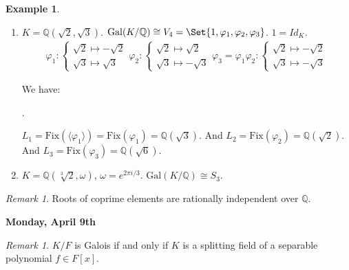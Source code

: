\documentclass[9pt,reqno,twoside]{amsbook}
\theoremstyle{plain}
\numberwithin{section}{chapter}
\numberwithin{equation}{chapter}
\theoremstyle{definition}
\newtheorem{Ex}[theorem]{Example}
\theoremstyle{remark}
\newtheorem{rem}[theorem]{Remark}
\theoremstyle{plain}
\newcommand{\Q}{\mathbb{Q}}
\newcommand{\bb}{\vspace{3mm}}
\newcommand{\bee}{\begin{equation}\begin{aligned}}
\newcommand{\eee}{\end{aligned}\end{equation}}
\newcommand{\gal}{\mathrm{Gal}}
\newcommand{\fix}{\mathrm{Fix}}
\renewcommand{\phi}{\varphi}
\begin{document}
\begin{Ex}
\begin{enumerate}
\item 
$K = \Q(\sqrt{2},\sqrt{3})$. $\gal(K/\Q) \cong V_4 = \Set{1,\phi_1,\phi_2,\phi_3}$. $1 = Id_K$. 
\bee
\phi_1: \begin{cases}
\sqrt{2} \mapsto -\sqrt{2}\\
\sqrt{3} \mapsto \sqrt{3}
\end{cases}
\phi_2: \begin{cases}
\sqrt{2} \mapsto \sqrt{2}\\
\sqrt{3} \mapsto -\sqrt{3}
\end{cases}
\phi_3 = \phi_1\phi_2: \begin{cases}
\sqrt{2} \mapsto -\sqrt{2}\\
\sqrt{3} \mapsto -\sqrt{3}
\end{cases}
\eee

We have:
\begin{center}
.
\end{center}

$L_1 = \fix(\langle \phi_1 \rangle) = \fix( \phi_1) = \Q(\sqrt{3})$. And $L_2 = \fix(\phi_2) = \Q(\sqrt{2})$. And $L_3 = \fix(\phi_3) = \Q(\sqrt{6})$. 
\item $K = \Q(\sqrt[3]{2},\omega)$, $\omega = e^{2\pi i/3}$. $\gal(K/\Q) \cong S_3$. 
\end{enumerate}
\end{Ex}

\begin{rem}
Roots of coprime elements are rationally independent over $\Q$. 
\end{rem}


\bb

\textbf{Monday, April 9th}

\begin{rem}
$K/F$ is Galois if and only if $K$ is a splitting field of a separable polynomial $f \in F[x]$. 
\end{rem}
\end{document}

